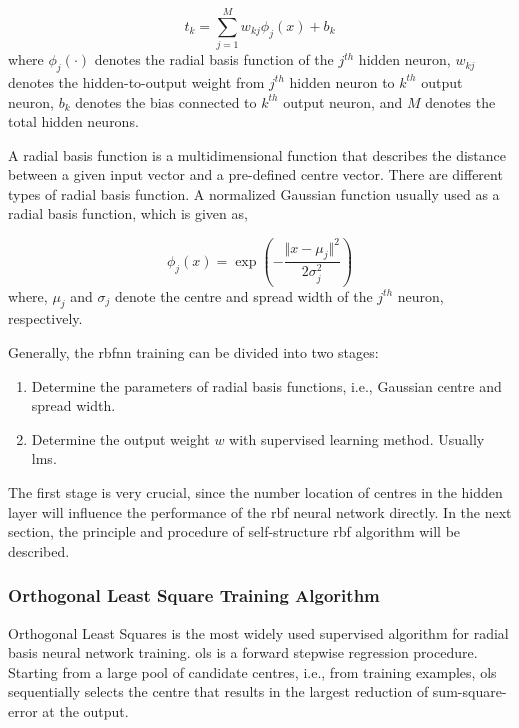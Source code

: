 \begin{equation}\label{equation_rbf_network_output}
t_k=\sum\limits_{j=1}^{M}w_{kj}\phi_j(x)+b_k
\end{equation}
where $\phi_j(\cdot)$ denotes the radial basis function of the $j^{th}$ hidden neuron, $w_{kj}$ denotes the hidden-to-output weight from $j^{th}$ hidden neuron to $k^{th}$ output neuron, $b_k$ denotes the bias connected to $k^{th}$ output neuron, and $M$ denotes the total hidden neurons.

A radial basis function is a multidimensional function that describes the distance between a given input vector and a pre-defined centre vector. There are different types of radial basis function.  A normalized Gaussian function usually used as a radial basis function, which is given as,

\begin{equation}\label{equation_radial_basis_fuction}
\phi_j(x)=\exp(-\frac{\Vert x-\mu_j\Vert^2}{2\sigma^2_j})
\end{equation}
where, $\mu_j$ and $\sigma_j$ denote the centre and spread width of the $j^{th}$ neuron, respectively.

Generally, the \ac{rbfnn} training can be divided into two stages:
\begin{enumerate}
\itemsep0em
\item Determine the parameters of radial basis functions, i.e., Gaussian centre and spread width.
\item Determine the output weight $w$ with supervised learning method. Usually \ac{lms}.
\end{enumerate}
The first stage is very crucial, since the number location of centres in the hidden layer will influence the performance of the \ac{rbf} neural network directly. In the next section, the principle and procedure of self-structure \ac{rbf} algorithm will be described.

\subsubsection{Orthogonal Least Square Training Algorithm}\label{section_ols}

Orthogonal Least Squares is the most widely used supervised algorithm for radial basis neural network training. \ac{ols} is a forward stepwise regression procedure. Starting from a large pool of candidate centres, i.e., from training examples, \ac{ols} sequentially selects the centre that results in the largest reduction of sum-square-error at the output.

